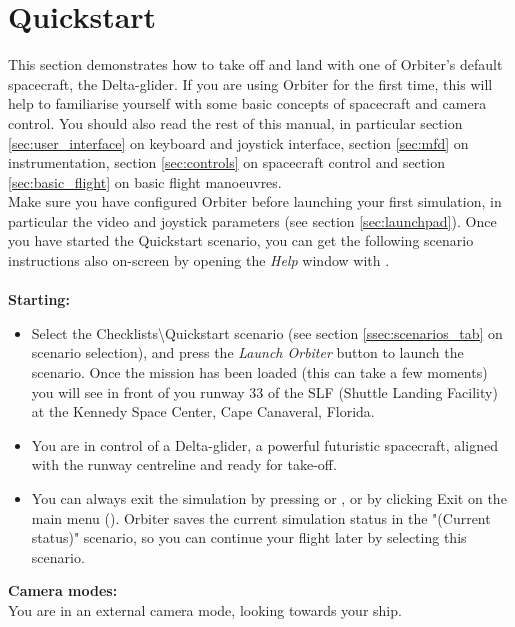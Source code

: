 \documentclass[Orbiter User Manual.tex]{subfiles}
\begin{document}
\section{Quickstart}
\label{sec:quickstart}
This section demonstrates how to take off and land with one of Orbiter's default spacecraft, the Delta-glider. If you are using Orbiter for the first time, this will help to familiarise yourself with some basic concepts of spacecraft and camera control. You should also read the rest of this manual, in particular section \ref{sec:user_interface} on keyboard and joystick interface, section \ref{sec:mfd} on instrumentation, section \ref{sec:controls} on spacecraft control and section \ref{sec:basic_flight} on basic flight manoeuvres.\\
Make sure you have configured Orbiter before launching your first simulation, in particular the video and joystick parameters (see section \ref{sec:launchpad}). Once you have started the Quickstart scenario, you can get the following scenario instructions also on-screen by opening the \textit{Help} window with \Alt{}.\\
\\
\textbf{Starting:}

\begin{itemize}
\item Select the Checklists\textbackslash Quickstart scenario (see section \ref{ssec:scenarios_tab} on scenario selection), and press the \textit{Launch Orbiter} button to launch the scenario. Once the mission has been loaded (this can take a few moments) you will see in front of you runway 33 of the SLF (Shuttle Landing Facility) at the Kennedy Space Center, Cape Canaveral, Florida.
\item You are in control of a Delta-glider, a powerful futuristic spacecraft, aligned with the runway centreline and ready for take-off.
\item You can always exit the simulation by pressing \Ctrl{} or \Alt{}, or by clicking Exit on the main menu (). Orbiter saves the current simulation status in the "(Current status)" scenario, so you can continue your flight later by selecting this scenario.
\end{itemize}

\noindent
\textbf{Camera modes:}\\
You are in an external camera mode, looking towards your ship.
\end{document}
